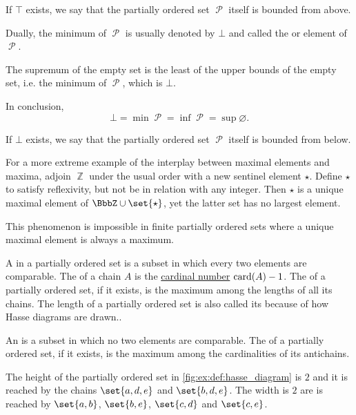 \begin{definition}
\begin{thmenum}
\begin{minipage}[t]{0.45\textwidth}
      If \( \top \) exists, we say that the partially ordered set \( \mscrP \) itself is bounded from above.
    \end{minipage}
    \hspace{0.02\textwidth}
    \begin{minipage}[t]{0.45\textwidth}
      Dually, the minimum of \( \mscrP \) is usually denoted by \( \bot \) and called the  or  element of \( \mscrP \).

      The supremum of the empty set is the least of the upper bounds of the empty set, i.e. the minimum of \( \mscrP \), which is \( \bot \).

      In conclusion,
      \begin{equation*}
        \bot = \min \mscrP = \inf \mscrP = \sup \varnothing.
      \end{equation*}

      If \( \bot \) exists, we say that the partially ordered set \( \mscrP \) itself is bounded from below.
    \end{minipage}
  \end{thmenum}
\end{definition}

\begin{example}\label{ex:unique_maximal_element_that_is_not_maximum}
  For a more extreme example of the interplay between maximal elements and maxima, adjoin \( \BbbZ \) under the usual order with a new sentinel element \( \star \). Define \( \star \) to satisfy reflexivity, but not be in relation with any integer. Then \( \star \) is a unique maximal element of \( \BbbZ \cup \set{ \star } \), yet the latter set has no largest element.

  This phenomenon is impossible in finite partially ordered sets where a unique maximal element is always a maximum.
\end{example}

\begin{definition}\label{def:partially_ordered_set_chain_and_antichain}
  A  in a partially ordered set is a subset in which every two elements are comparable. The  of a chain \( A \) is the \hyperref[def:cardinal]{cardinal number} \( \operatorname{card}(A) - 1 \). The  of a partially ordered set, if it exists, is the maximum among the lengths of all its chains. The length of a partially ordered set is also called its  because of how Hasse diagrams are drawn..

  An  is a subset in which no two elements are comparable. The  of a partially ordered set, if it exists, is the maximum among the cardinalities of its antichains.

  The height of the partially ordered set in \cref{fig:ex:def:hasse_diagram} is \( 2 \) and it is reached by the chains \( \set{ a, d, e } \) and \( \set{ b, d, e } \). The width is \( 2 \) are is reached by \( \set{ a, b } \), \( \set{ b, e } \), \( \set{ c, d } \) and \( \set{ c, e } \).
\end{definition}

